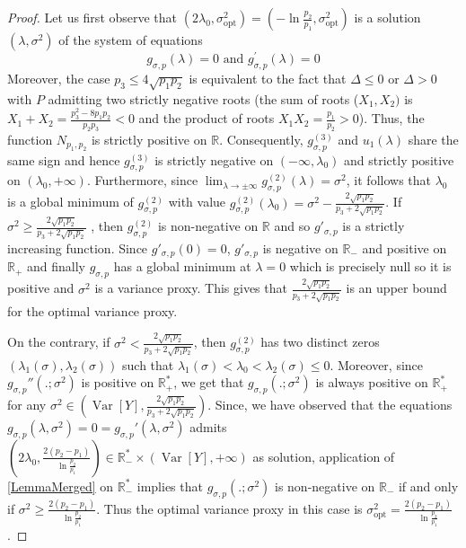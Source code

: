 \documentclass[a4paper, 10pt]{article}
\newcommand{\beq}{\begin{equation}}
\newcommand{\eeq}{\end{equation}}
\theoremstyle{definition}
\begin{document}
\begin{proof}Let us first observe that $\left(2\lambda_0,\sigma_{\mathrm{opt}}^2\right)=\left(-\ln\frac{p_2}{p_1},\sigma_{\mathrm{opt}}^2\right)$ is a solution $(\lambda,\sigma^2)$ of the system of equations
\beq g_{\sigma,p}(\lambda)=0 \text{ and } g^{'}_{\sigma,p}(\lambda) = 0\eeq
Moreover, the case $p_3\leq 4\sqrt{p_1p_2}$ is equivalent to the fact that $\Delta\leq 0$ or $\Delta>0$ with $P$ admitting two strictly negative roots (the sum of roots ($X_1,X_2)$ is $X_1+X_2 = \frac{p_3^2-8p_1p_2}{p_2p_3} < 0$ and the product of roots $X_1 X_2 = \frac{p_1}{p_2}>0$). Thus, the function $N_{p_1,p_2}$ is strictly positive on $\mathbb{R}$. Consequently, $g^{(3)}_{\sigma,p}$ and $u_1(\lambda)$ share the same sign and hence $g_{\sigma,p}^{(3)}$ is strictly negative on $(-\infty,\lambda_0)$ and strictly positive on $(\lambda_{0}, +\infty)$. Furthermore, since $\lim_{\lambda\to \pm \infty} g^{(2)}_{\sigma, p}(\lambda)=\sigma^2$, it follows that $\lambda_0$ is a global minimum of $g^{(2)}_{\sigma, p}$ with value $g^{(2)}_{\sigma,p}(\lambda_{0})=\sigma^2-\frac{2\sqrt{p_1p_2}}{p_3+2\sqrt{p_1p_2}}$. If $\sigma^2\geq\frac{2\sqrt{p_1p_2}}{p_3+2\sqrt{p_1p_2}}$ , then $g^{(2)}_{\sigma,p}$ is non-negative on $\mathbb{R}$ and so $g'_{\sigma,p}$ is a strictly increasing function. Since $g'_{\sigma,p}(0)=0$, $g'_{\sigma,p}$ is negative on $\mathbb{R}_-$ and positive on $\mathbb{R}_+$ and finally $g_{\sigma,p}$ has a global minimum at $\lambda=0$ which is precisely null so it is positive and $\sigma^2$ is a variance proxy. This gives that $\frac{2\sqrt{p_1p_2}}{p_3+2\sqrt{p_1p_2}}$ is an upper bound for the optimal variance proxy. 

On the contrary, if $\sigma^2<\frac{2\sqrt{p_1p_2}}{p_3+2\sqrt{p_1p_2}}$, then $g^{(2)}_{\sigma, p}$ has two distinct zeros $(\lambda_1(\sigma),\lambda_2(\sigma))$ such that $\lambda_1(\sigma)<\lambda_0<\lambda_2(\sigma)\leq 0$. Moreover, since $g_{\sigma,p}''(.;\sigma^2)$ is positive on $\mathbb{R}_+^*$, we get that $g_{\sigma,p}(.;\sigma^2)$ is always positive on $\mathbb{R}_+^*$ for any $\sigma^2\in \left(\operatorname{Var}[Y],\frac{2\sqrt{p_1p_2}}{p_3+2\sqrt{p_1p_2}} \right) $. Since, we have observed that the equations $g_{\sigma,p}(\lambda,\sigma^2)=0=g_{\sigma,p}'(\lambda,\sigma^2)$ admits $\left(2\lambda_0,\frac{2(p_2-p_1)}{\ln \frac{p_2}{p_1}}\right)\in \mathbb{R}_-^*\times \left(\operatorname{Var}[Y],+\infty\right)$ as solution, application of \autoref{LemmaMerged} on $\mathbb{R}_-^*$ implies that $g_{\sigma,p}(.;\sigma^2)$ is non-negative on $\mathbb{R}_-$ if and only if $\sigma^2\geq \frac{2(p_2-p_1)}{\ln \frac{p_2}{p_1}} $. Thus the optimal variance proxy in this case is $\sigma_{\mathrm{opt}}^2= \frac{2(p_2-p_1)}{\ln \frac{p_2}{p_1}}$ . 

\end{proof}
\end{document}

